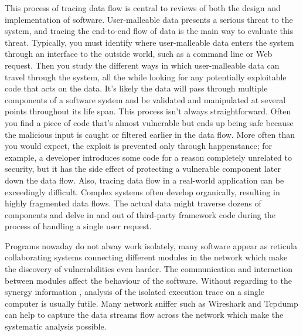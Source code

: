 This process of tracing data flow is central to reviews of both the design and
implementation of software. User-malleable data presents a serious threat to the
system, and tracing the end-to-end flow of data is the main way to evaluate this
threat. Typically, you must identify where user-malleable data enters the system
through an interface to the outside world, such as a command line or Web request.
Then you study the different ways in which user-malleable data can travel through
the system, all the while looking for any potentially exploitable code that acts on the
data. It's likely the data will pass through multiple components of a software system
and be validated and manipulated at several points throughout its life span.
This process isn't always straightforward. Often you find a piece of code that's almost
vulnerable but ends up being safe because the malicious input is caught or filtered
earlier in the data flow. More often than you would expect, the exploit is prevented
only through happenstance; for example, a developer introduces some code for a
reason completely unrelated to security, but it has the side effect of protecting a
vulnerable component later down the data flow. Also, tracing data flow in a real-world
application can be exceedingly difficult. Complex systems often develop organically,
resulting in highly fragmented data flows. The actual data might traverse dozens of
components and delve in and out of third-party framework code during the process of
handling a single user request.

Programs nowaday do not alway work isolately,  many software  appear as  reticula collaborating systems connecting different modules in the network\cite{PhysRevE.68.046116} which make the discovery of vulnerabilities even harder. The communication and interaction between modules affect the behaviour of the software. Without regarding to the synergy information , analysis of the isolated execution trace on a single computer is usually futile. Many network sniffer such as Wireshark\cite{_wireshark_????} and Tcpdump\cite{tcpdump_tcpdump/libpcap_????} can help to capture the data streams flow across the network which make the systematic analysis possible.\\


